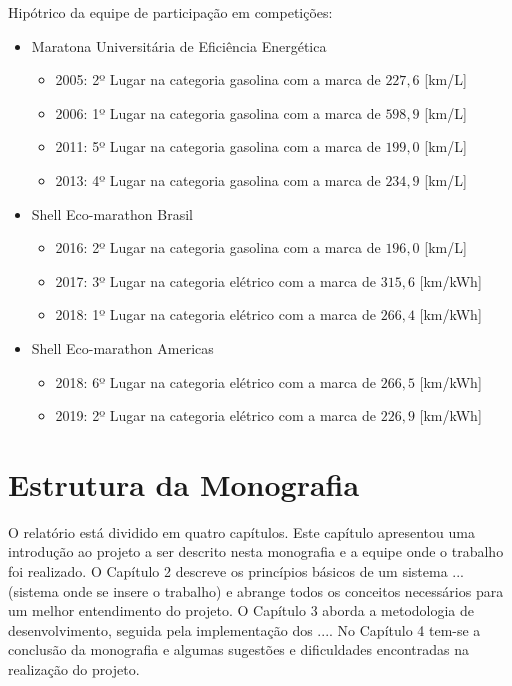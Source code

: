 Hipótrico da equipe de participação em competições:
\begin{itemize}
    \item Maratona Universitária de Eficiência Energética
        \begin{itemize}
            \item 2005: 2º Lugar na categoria gasolina com a marca de $227,6$ [km/L]
            \item 2006: 1º Lugar na categoria gasolina com a marca de $598,9$ [km/L]
            \item 2011: 5º Lugar na categoria gasolina com a marca de $199,0$ [km/L]
            \item 2013: 4º Lugar na categoria gasolina com a marca de $234,9$ [km/L]
        \end{itemize}
    \item Shell Eco-marathon Brasil
        \begin{itemize}
            \item 2016: 2º Lugar na categoria gasolina com a marca de $196,0$ [km/L]
            \item 2017: 3º Lugar na categoria elétrico com a marca de $315,6$ [km/kWh]
            \item 2018: 1º Lugar na categoria elétrico com a marca de $266,4$ [km/kWh]
        \end{itemize}
    \item Shell Eco-marathon Americas
        \begin{itemize}
            \item 2018: 6º Lugar na categoria elétrico com a marca de $266,5$ [km/kWh]
            \item 2019: 2º Lugar na categoria elétrico com a marca de $226,9$ [km/kWh]
        \end{itemize}
\end{itemize}

\section{Estrutura da Monografia}
\label{sec:organizacao}

O relatório está dividido em quatro capítulos. Este capítulo apresentou uma introdução ao projeto a ser descrito nesta monografia e a equipe onde o
trabalho foi realizado. O Capítulo 2 descreve os princípios básicos de um sistema ... (sistema onde se insere o trabalho) e abrange todos os
conceitos necessários para um melhor entendimento do projeto. O Capítulo 3 aborda a metodologia de desenvolvimento, seguida pela implementação dos
.... No Capítulo 4 tem-se a conclusão da  monografia e algumas sugestões e dificuldades encontradas na realização do projeto.

\clearpage